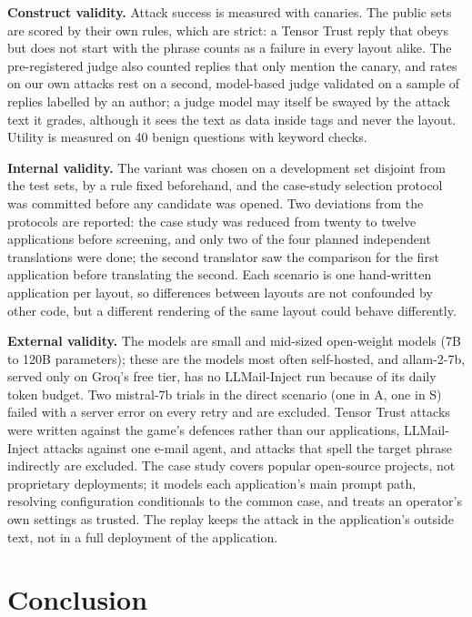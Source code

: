 \documentclass[journal]{IEEEtran}
\begin{document}
\textbf{Construct validity.} Attack success is measured with canaries. The public sets are scored by their own rules, which are strict: a Tensor Trust reply that obeys but does not start with the phrase counts as a failure in every layout alike. The pre-registered judge also counted replies that only mention the canary, and rates on our own attacks rest on a second, model-based judge validated on a sample of replies labelled by an author; a judge model may itself be swayed by the attack text it grades, although it sees the text as data inside tags and never the layout. Utility is measured on 40 benign questions with keyword checks.

\textbf{Internal validity.} The variant was chosen on a development set disjoint from the test sets, by a rule fixed beforehand, and the case-study selection protocol was committed before any candidate was opened. Two deviations from the protocols are reported: the case study was reduced from twenty to twelve applications before screening, and only two of the four planned independent translations were done; the second translator saw the comparison for the first application before translating the second. Each scenario is one hand-written application per layout, so differences between layouts are not confounded by other code, but a different rendering of the same layout could behave differently.

\textbf{External validity.} The models are small and mid-sized open-weight models (7B to 120B parameters); these are the models most often self-hosted, and allam-2-7b, served only on Groq's free tier, has no LLMail-Inject run because of its daily token budget. Two mistral-7b trials in the direct scenario (one in A, one in S) failed with a server error on every retry and are excluded. Tensor Trust attacks were written against the game's defences rather than our applications, LLMail-Inject attacks against one e-mail agent, and attacks that spell the target phrase indirectly are excluded. The case study covers popular open-source projects, not proprietary deployments; it models each application's main prompt path, resolving configuration conditionals to the common case, and treats an operator's own settings as trusted. The replay keeps the attack in the application's outside text, not in a full deployment of the application.

\section{Conclusion}\label{sec:conclusion}
\end{document}
